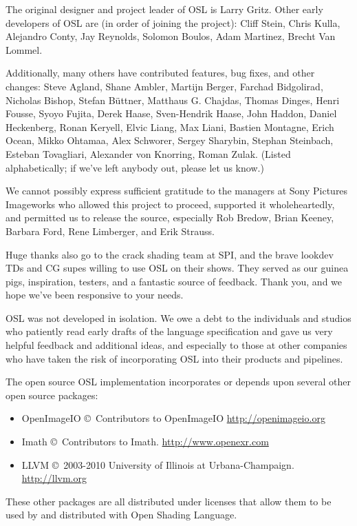 \documentclass[11pt,letterpaper]{book}
\def\product{{\sffamily Open Shading Language}\xspace}
\begin{document}
The original designer and project leader of OSL is Larry Gritz. Other early
developers of OSL are (in order of joining the project): Cliff Stein, Chris
Kulla, Alejandro Conty, Jay Reynolds, Solomon Boulos, Adam Martinez, Brecht
Van Lommel.

Additionally, many others have contributed features, bug fixes, and other
changes: Steve Agland, Shane Ambler, Martijn Berger, Farchad Bidgolirad,
Nicholas Bishop, Stefan Büttner, Matthaus G. Chajdas, Thomas Dinges, Henri
Fousse, Syoyo Fujita, Derek Haase, Sven-Hendrik Haase, John Haddon, Daniel
Heckenberg, Ronan Keryell, Elvic Liang, Max Liani, Bastien Montagne, Erich
Ocean, Mikko Ohtamaa, Alex Schworer, Sergey Sharybin, Stephan Steinbach,
Esteban Tovagliari, Alexander von Knorring, Roman Zulak. (Listed
alphabetically; if we've left anybody out, please let us know.)

We cannot possibly express sufficient gratitude to the managers at Sony
Pictures Imageworks who allowed this project to proceed, supported it
wholeheartedly, and permitted us to release the source, especially Rob
Bredow, Brian Keeney, Barbara Ford, Rene Limberger, and Erik Strauss.

Huge thanks also go to the crack shading team at SPI, and the brave
lookdev TDs and CG supes willing to use OSL on their shows.  They served
as our guinea pigs, inspiration, testers, and a fantastic source of
feedback.  Thank you, and we hope we've been responsive to your needs.

OSL was not developed in isolation.  We owe a debt to the individuals
and studios who patiently read early drafts of the language
specification and gave us very helpful feedback and additional ideas,
and especially to those at other companies who have taken the risk of
incorporating OSL into their products and pipelines.

\bigskip
The open source OSL implementation incorporates or depends upon several
other open source packages:

\begin{itemize}
\item {\cf OpenImageIO} \copyright\ Contributors to OpenImageIO
\url{http://openimageio.org}
\item Imath \copyright\ Contributors to Imath.
\url{http://www.openexr.com}
\item LLVM \copyright\ 2003-2010 University of Illinois at
  Urbana-Champaign. \url{http://llvm.org}
\end{itemize}

These other packages are all distributed under licenses that allow them
to be used by and distributed with \product.
\end{document}
